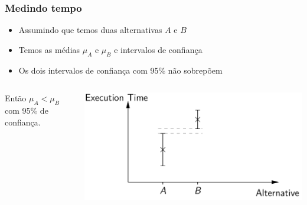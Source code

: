 \documentclass[xcolor={usenames,dvipsnames},12pt,presentation,aspectratio=169]{beamer}
\begin{document}
\begin{frame}[fragile]
  \frametitle{Medindo tempo}
  \begin{itemize}
    \item Assumindo que temos duas alternativas $A$ e $B$ 
    \item Temos as médias $\mu_{A}$ e $\mu_{B}$ e intervalos de confiança
    \item Os dois intervalos de confiança com 95\% não sobrepõem
  \end{itemize}
  \begin{columns}
    \begin{column}{0.4\textwidth}
    Então $\mu_A < \mu_B$ com 95\% de confiança.
    \end{column}
    \begin{column}{0.6\textwidth}
      \begin{center}
        \includegraphics[width=\textwidth]{ci1.png}
     \end{center}           
    \end{column}
  \end{columns}
\end{frame}
\end{document}
